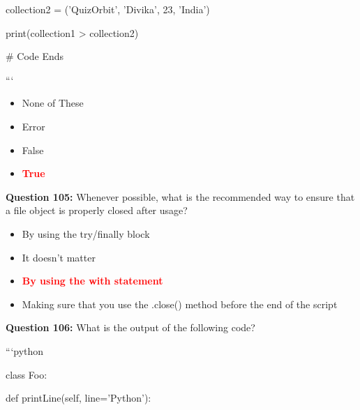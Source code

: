 \documentclass[12pt,a4paper]{article}
\begin{document}
\newline
collection2 = ('QuizOrbit', 'Divika', 23, 'India')\newline

\newline
print(collection1 > collection2)\newline

\newline
# Code Ends\newline

\newline
```

\begin{itemize}
    \item[\textbf{A.}] None of These
    \item[\textbf{B.}] Error
    \item[\textbf{C.}] False
    \item[\textbf{D.}] \textcolor{red}{\textbf{True}}
\end{itemize}

\vspace{0.5cm}

\textbf{Question 105:} Whenever possible, what is the recommended way to ensure that a file object is properly closed after usage?

\begin{itemize}
    \item[\textbf{A.}] By using the try/finally block
    \item[\textbf{B.}] It doesn't matter
    \item[\textbf{C.}] \textcolor{red}{\textbf{By using the with statement}}
    \item[\textbf{D.}] Making sure that you use the .close() method before the end of the script
\end{itemize}

\vspace{0.5cm}

\textbf{Question 106:} What is the output of the following code?\newline

\newline
\newline

\newline
```python\newline

\newline
class Foo:\newline

\newline
    def printLine(self, line='Python'):\newline
\end{document}
